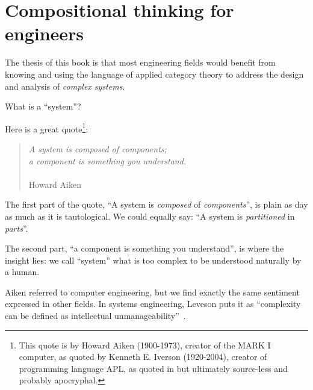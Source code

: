 
\section[Compositionality for engineers]{Compositional thinking for engineers}
\label{sec:compositionality-for-engineers}

The thesis of this book is that most engineering fields would benefit from knowing and using the language of applied category theory to address the design and analysis of \emph{complex systems}.


\label{subsec:introduction-systems-and-components}

What is a ``system''?

Here is a great quote\footnote{
    This quote is by Howard Aiken (1900-1973), creator of the MARK I computer,
    as quoted by Kenneth E.
    Iverson (1920-2004), creator of programming language APL,
    as quoted in%
    but ultimately source-less and probably apocryphal.
}:

\begin{quote}
    \emph{A system is composed of components; \\
        a component is something you understand.}\\ \\
    Howard Aiken
\end{quote}

The first part of the quote, ``A system is \emph{composed} of \emph{components}'', is plain as day as much as it is tautological.
We could equally say: ``A system is \emph{partitioned} in \emph{parts}''.

The second part, ``a component is something you understand'', is where the insight lies: we call ``system'' what is too complex to be understood naturally by a human.

Aiken referred to computer engineering, but we find exactly the same sentiment expressed in other fields.
In systems engineering, Leveson puts it as ``complexity can be defined as intellectual unmanageability''~\cite{leveson12engineering}.


